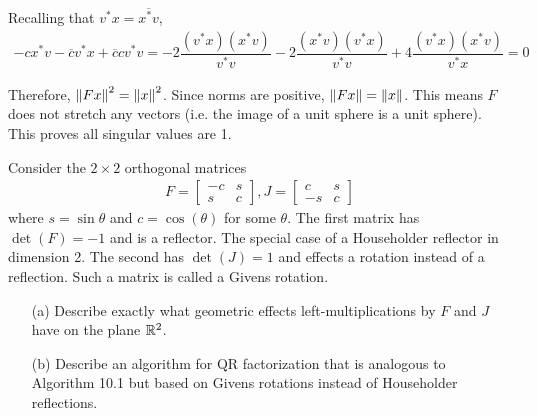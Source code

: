 \documentclass[10pt]{article}
\begin{document}
\begin{solution}[Solution]
\begin{enumerate}
        Recalling that \( v^*x=\overline{x^*v} \),
        \begin{align*}
            -cx^*v-\overline{c}v^*x+\overline{c}cv^*v = -2 \dfrac{(v^*x)(x^*v)}{v^*v}-2 \dfrac{(x^*v)(v^*x)}{v^*v}+4 \dfrac{(v^*x)(x^*v)}{v^*x} = 0
        \end{align*}

        Therefore, \( \left\lVert Fx\right\rVert^2=\left\lVert x\right\rVert^2 \). Since norms are positive, \( \left\lVert Fx\right\rVert=\left\lVert x\right\rVert \). This means \( F \) does not stretch any vectors (i.e. the image of a unit sphere is a unit sphere). This proves all singular values are 1.      

\end{enumerate}

\end{solution}


\begin{problem}[Exercise 10.4]
Consider the \( 2\times 2 \) orthogonal matrices
\begin{align*}
    F=\left[\begin{array}{cc}-c & s \\ s & c\end{array}\right], J=\left[\begin{array}{cc}c & s \\ -s & c\end{array}\right]
\end{align*}
where \( s=\sin\theta \) and \( c=\cos(\theta) \) for some \( \theta \). The first matrix has \( \det(F)=-1 \) and is a reflector. The special case of a Householder reflector in dimension 2. The second has \( \det(J)=1 \) and effects a rotation instead of a reflection. Such a matrix is called a Givens rotation.
\begin{enumerate}
    \item[(a)] Describe exactly what geometric effects left-multiplications by \( F \) and \( J \) have on the plane \( \mathbb{R}^2 \).
    \item[(b)] Describe an algorithm for QR factorization that is analogous to Algorithm 10.1 but based on Givens rotations instead of Householder reflections.
\end{enumerate}
\end{problem}
\end{document}
